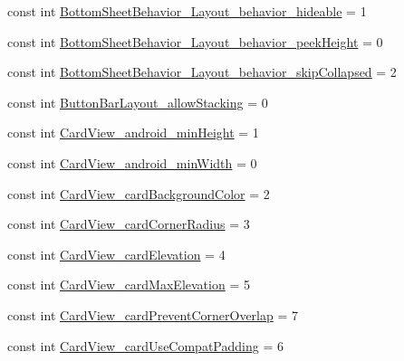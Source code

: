 \begin{DoxyCompactItemize}
\item 
const int \mbox{\hyperlink{class_f_w_p_s___app_1_1_droid_1_1_resource_1_1_styleable_a2eccc6fae82eafde2bc1ce117c6626f6}{Bottom\+Sheet\+Behavior\+\_\+\+Layout\+\_\+behavior\+\_\+hideable}} = 1
\item 
const int \mbox{\hyperlink{class_f_w_p_s___app_1_1_droid_1_1_resource_1_1_styleable_ac9699f5990c7cdad3490d5a227408f02}{Bottom\+Sheet\+Behavior\+\_\+\+Layout\+\_\+behavior\+\_\+peek\+Height}} = 0
\item 
const int \mbox{\hyperlink{class_f_w_p_s___app_1_1_droid_1_1_resource_1_1_styleable_a55482fa5f404d24a3541d910e6655187}{Bottom\+Sheet\+Behavior\+\_\+\+Layout\+\_\+behavior\+\_\+skip\+Collapsed}} = 2
\item 
const int \mbox{\hyperlink{class_f_w_p_s___app_1_1_droid_1_1_resource_1_1_styleable_a19462091a3eeba3a60f15230278eb765}{Button\+Bar\+Layout\+\_\+allow\+Stacking}} = 0
\item 
const int \mbox{\hyperlink{class_f_w_p_s___app_1_1_droid_1_1_resource_1_1_styleable_a2d8bc980adecf5b3582ccef191b95d3f}{Card\+View\+\_\+android\+\_\+min\+Height}} = 1
\item 
const int \mbox{\hyperlink{class_f_w_p_s___app_1_1_droid_1_1_resource_1_1_styleable_a14996dc175ca92dccf700cb200881646}{Card\+View\+\_\+android\+\_\+min\+Width}} = 0
\item 
const int \mbox{\hyperlink{class_f_w_p_s___app_1_1_droid_1_1_resource_1_1_styleable_ab384d1413909f0dc292fe9d595dbb90b}{Card\+View\+\_\+card\+Background\+Color}} = 2
\item 
const int \mbox{\hyperlink{class_f_w_p_s___app_1_1_droid_1_1_resource_1_1_styleable_af29b39ef8fa71142dad1e591848a1a2a}{Card\+View\+\_\+card\+Corner\+Radius}} = 3
\item 
const int \mbox{\hyperlink{class_f_w_p_s___app_1_1_droid_1_1_resource_1_1_styleable_a8c6036c088fa364cb35719f4b93296cc}{Card\+View\+\_\+card\+Elevation}} = 4
\item 
const int \mbox{\hyperlink{class_f_w_p_s___app_1_1_droid_1_1_resource_1_1_styleable_a44e5257c29d7dae2294e6ab0523508b3}{Card\+View\+\_\+card\+Max\+Elevation}} = 5
\item 
const int \mbox{\hyperlink{class_f_w_p_s___app_1_1_droid_1_1_resource_1_1_styleable_ac61df52e48c8943e7c4287759815fa91}{Card\+View\+\_\+card\+Prevent\+Corner\+Overlap}} = 7
\item 
const int \mbox{\hyperlink{class_f_w_p_s___app_1_1_droid_1_1_resource_1_1_styleable_a845f2b9e2d6f73ab389cfeb72098026b}{Card\+View\+\_\+card\+Use\+Compat\+Padding}} = 6

\end{DoxyCompactItemize}
